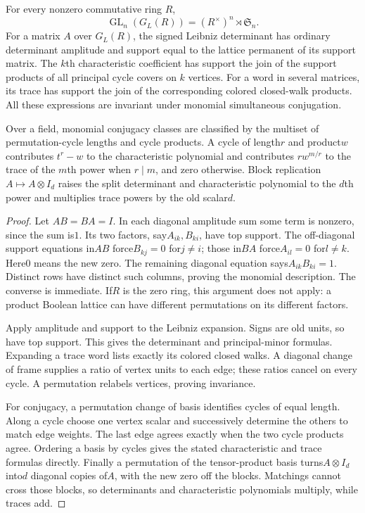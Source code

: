 \begin{proposition}\label{prop:lattice-cycles}
For every nonzero commutative ring $R$,
\[
 \operatorname{GL}_n(G_L(R))=(R^\times)^n\rtimes\mathfrak S_n.
\]
For a matrix $A$ over $G_L(R)$, the signed Leibniz determinant has ordinary
determinant amplitude and support equal to the lattice permanent of its
support matrix. The $k$th characteristic coefficient has support the join
of the support products of all principal cycle covers on $k$ vertices.
For a word in several matrices, its trace has support the join of the
corresponding colored closed-walk products. All these expressions are
invariant under monomial simultaneous conjugation.

Over a field, monomial conjugacy classes are classified by the multiset
of permutation-cycle lengths and cycle products. A cycle of length$r$
and product$w$ contributes $t^r-w$ to the characteristic polynomial and
contributes $r w^{m/r}$ to the trace of the $m$th power when $r\mid m$,
and zero otherwise. Block replication $A\mapsto A\otimes I_d$ raises
the split determinant and characteristic polynomial to the $d$th power
and multiplies trace powers by the old scalar$d$.
\end{proposition}
\begin{proof}
Let $AB=BA=I$. In each diagonal amplitude sum some term is nonzero,
since the sum is$1$. Its two factors, say$A_{ik},B_{ki}$, have top support.
The off-diagonal support equations in$AB$ force$B_{kj}=0$ for$j\ne i$;
those in$BA$ force$A_{i l}=0$ for$l\ne k$. Here$0$ means the new zero.
The remaining diagonal equation says$A_{ik}B_{ki}=1$. Distinct rows have
distinct such columns, proving the monomial description. The converse is
immediate. If$R$ is the zero ring, this argument does not apply: a product
Boolean lattice can have different permutations on its different factors.

Apply amplitude and support to the Leibniz expansion. Signs are old units,
so have top support. This gives the determinant and principal-minor
formulas. Expanding a trace word lists exactly its colored closed walks.
A diagonal change of frame supplies a ratio of vertex units to each edge;
these ratios cancel on every cycle. A permutation relabels vertices,
proving invariance.

For conjugacy, a permutation change of basis identifies cycles of equal
length. Along a cycle choose one vertex scalar and successively determine
the others to match edge weights. The last edge agrees exactly when the
two cycle products agree. Ordering a basis by cycles gives the stated
characteristic and trace formulas directly. Finally a permutation of the
tensor-product basis turns$A\otimes I_d$ into$d$ diagonal copies of$A$,
with the new zero off the blocks. Matchings cannot cross those blocks,
so determinants and characteristic polynomials multiply, while traces add.
\end{proof}

